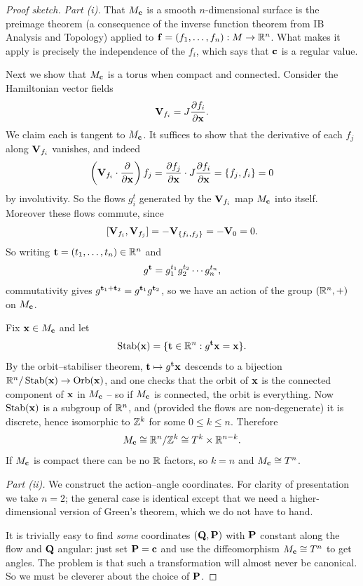 \documentclass[a4paper]{scrartcl}
\begin{document}
\begin{proof}[Proof sketch]
	\emph{Part (i).} That $M_{\mathbf{c}}$ is a smooth $n$-dimensional surface is the preimage theorem (a consequence of the inverse function theorem from IB Analysis and Topology) applied to $\mathbf{f} = (f_1,\dots,f_n) : M \to \mathbb{R}^n$. What makes it apply is precisely the independence of the $f_i$, which says that $\mathbf{c}$ is a regular value.

	Next we show that $M_{\mathbf{c}}$ is a torus when compact and connected. Consider the Hamiltonian vector fields
	$$
	\mathbf{V}_{f_i} = J\frac{\partial f_i}{\partial \mathbf{x}}.
	$$
	We claim each is tangent to $M_{\mathbf{c}}$. It suffices to show that the derivative of each $f_j$ along $\mathbf{V}_{f_i}$ vanishes, and indeed
	$$
	\left(\mathbf{V}_{f_i}\cdot\frac{\partial}{\partial \mathbf{x}}\right)f_j = \frac{\partial f_j}{\partial \mathbf{x}}\cdot J\frac{\partial f_i}{\partial \mathbf{x}} = \{f_j, f_i\} = 0
	$$
	by involutivity. So the flows $g_i^{t}$ generated by the $\mathbf{V}_{f_i}$ map $M_{\mathbf{c}}$ into itself. Moreover these flows commute, since
	$$
	[\mathbf{V}_{f_i}, \mathbf{V}_{f_j}] = -\mathbf{V}_{\{f_i, f_j\}} = -\mathbf{V}_0 = 0.
	$$
	So writing $\mathbf{t} = (t_1,\dots,t_n)\in\mathbb{R}^n$ and
	$$
	g^{\mathbf{t}} = g_1^{t_1}g_2^{t_2}\cdots g_n^{t_n},
	$$
	commutativity gives $g^{\mathbf{t}_1 + \mathbf{t}_2} = g^{\mathbf{t}_1}g^{\mathbf{t}_2}$, so we have an action of the group $(\mathbb{R}^n, +)$ on $M_{\mathbf{c}}$.

	Fix $\mathbf{x} \in M_{\mathbf{c}}$ and let
	$$
	\operatorname{Stab}(\mathbf{x}) = \{\mathbf{t}\in\mathbb{R}^n : g^{\mathbf{t}}\mathbf{x} = \mathbf{x}\}.
	$$
	By the orbit--stabiliser theorem, $\mathbf{t} \mapsto g^{\mathbf{t}}\mathbf{x}$ descends to a bijection $\mathbb{R}^n/\operatorname{Stab}(\mathbf{x})\to \operatorname{Orb}(\mathbf{x})$, and one checks that the orbit of $\mathbf{x}$ is the connected component of $\mathbf{x}$ in $M_{\mathbf{c}}$ -- so if $M_{\mathbf{c}}$ is connected, the orbit is everything. Now $\operatorname{Stab}(\mathbf{x})$ is a subgroup of $\mathbb{R}^n$, and (provided the flows are non-degenerate) it is discrete, hence isomorphic to $\mathbb{Z}^k$ for some $0 \le k \le n$. Therefore
	$$
	M_{\mathbf{c}}\cong \mathbb{R}^n/\mathbb{Z}^k \cong T^k\times\mathbb{R}^{n-k}.
	$$
	If $M_{\mathbf{c}}$ is compact there can be no $\mathbb{R}$ factors, so $k = n$ and $M_{\mathbf{c}}\cong T^n$.

	\emph{Part (ii).} We construct the action--angle coordinates. For clarity of presentation we take $n = 2$; the general case is identical except that we need a higher-dimensional version of Green's theorem, which we do not have to hand.

	It is trivially easy to find \emph{some} coordinates $(\mathbf{Q}, \mathbf{P})$ with $\mathbf{P}$ constant along the flow and $\mathbf{Q}$ angular: just set $\mathbf{P} = \mathbf{c}$ and use the diffeomorphism $M_{\mathbf{c}}\cong T^n$ to get angles. The problem is that such a transformation will almost never be canonical. So we must be cleverer about the choice of $\mathbf{P}$.


\end{proof}
\end{document}
